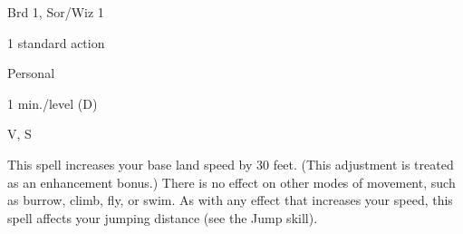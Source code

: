 
\begin{description*}
\item[Level:] Brd 1, Sor/Wiz 1
\item[Casting Time:] 1 standard action
\item[Range:] Personal
\item[Duration:] 1 min./level (D)
\item[Components:] V, S
\end{description*}

This spell increases your base land speed by 30 feet. (This adjustment is treated
as an enhancement bonus.) There is no effect on other modes of movement, such as
burrow, climb, fly, or swim. As with any effect that increases your speed, this
spell affects your jumping distance (see the Jump skill).